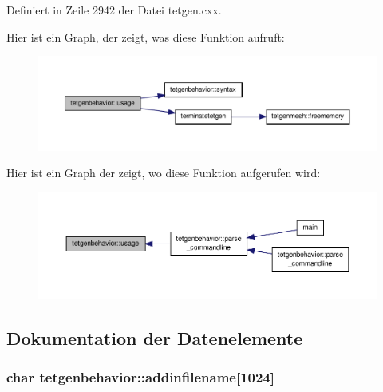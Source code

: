 Definiert in Zeile 2942 der Datei tetgen.\-cxx.



Hier ist ein Graph, der zeigt, was diese Funktion aufruft\-:\nopagebreak
\begin{figure}[H]
\begin{center}
\leavevmode
\includegraphics[width=350pt]{classtetgenbehavior_aa0bf59fe9ca35269d58e5f1ee10aca05_cgraph}
\end{center}
\end{figure}




Hier ist ein Graph der zeigt, wo diese Funktion aufgerufen wird\-:\nopagebreak
\begin{figure}[H]
\begin{center}
\leavevmode
\includegraphics[width=350pt]{classtetgenbehavior_aa0bf59fe9ca35269d58e5f1ee10aca05_icgraph}
\end{center}
\end{figure}




\subsection{Dokumentation der Datenelemente}
\hypertarget{classtetgenbehavior_a627804470698cc1883fd93999727e334}{
\subsubsection[{addinfilename}]{\setlength{\rightskip}{0pt plus 5cm}char tetgenbehavior\-::addinfilename\mbox{[}1024\mbox{]}}}\label{classtetgenbehavior_a627804470698cc1883fd93999727e334}



